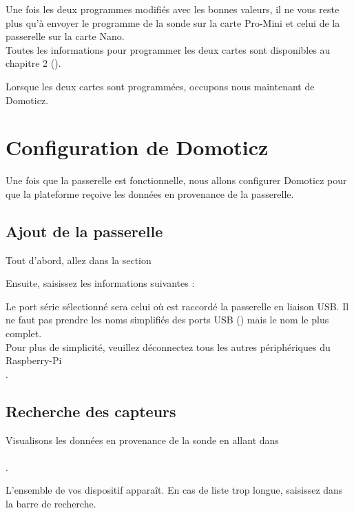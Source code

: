 Une fois les deux programmes modifiés avec les bonnes valeurs, il ne vous reste plus qu'à envoyer le programme de la sonde sur la carte Pro-Mini et celui de la passerelle sur la carte Nano.\\
Toutes les informations pour programmer les deux cartes sont disponibles au chapitre 2 ().

Lorsque les deux cartes sont programmées, occupons nous maintenant de Domoticz.\chapter{Configuration de Domoticz}

Une fois que la passerelle est fonctionnelle, nous allons configurer Domoticz pour que la plateforme reçoive 
les données en provenance de la passerelle.

\section{Ajout de la passerelle}

Tout d'abord, allez dans la section 


Ensuite, saisissez les informations suivantes :


Le port série sélectionné sera celui où est raccordé la passerelle en liaison USB.
Il ne faut pas prendre les noms simplifiés des ports USB () mais le nom le plus complet.\\
Pour plus de simplicité, veuillez déconnectez tous les autres périphériques du Raspberry-Pi\\.


\section{Recherche des capteurs}

Visualisons les données en provenance de la sonde en allant dans \\
\\.

L'ensemble de vos dispositif apparaît. En cas de liste trop longue, saisissez  dans la barre de recherche.




